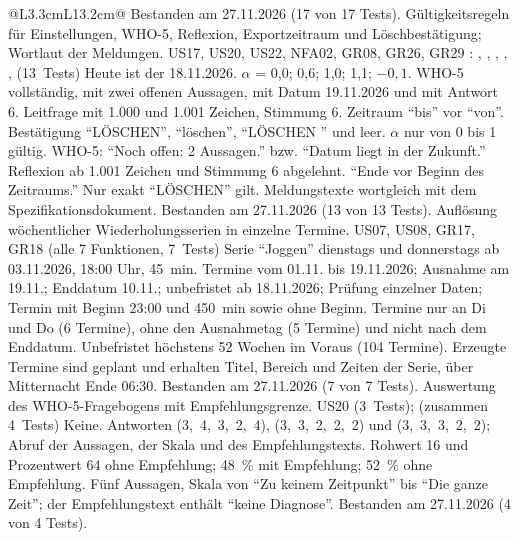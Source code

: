 \begin{longtable}{@{}L{3.3cm}L{13.2cm}@{}}
    {Bestanden am 27.11.2026 (17 von 17 Tests).}
  \midrule
    {Gültigkeitsregeln für Einstellungen, WHO-5, Reflexion, Exportzeitraum und Löschbestätigung; Wortlaut der Meldungen.}
    {US17, US20, US22, NFA02, GR08, GR26, GR29}
    {: , , , , ,  (13~Tests)}
    {Heute ist der 18.11.2026.}
    {$\alpha$ = 0,0; 0,6; 1,0; 1,1; $-0{,}1$. WHO-5 vollständig, mit zwei offenen Aussagen, mit Datum 19.11.2026 und mit Antwort 6. Leitfrage mit 1.000 und 1.001 Zeichen, Stimmung 6. Zeitraum \enquote{bis} vor \enquote{von}. Bestätigung \enquote{LÖSCHEN}, \enquote{löschen}, \enquote{LÖSCHEN } und leer.}
    {$\alpha$ nur von 0 bis 1 gültig. WHO-5: \enquote{Noch offen: 2 Aussagen.} bzw. \enquote{Datum liegt in der Zukunft.} Reflexion ab 1.001 Zeichen und Stimmung 6 abgelehnt. \enquote{Ende vor Beginn des Zeitraums.} Nur exakt \enquote{LÖSCHEN} gilt. Meldungstexte wortgleich mit dem Spezifikationsdokument.}
    {Bestanden am 27.11.2026 (13 von 13 Tests).}
  \midrule
    {Auflösung wöchentlicher Wiederholungsserien in einzelne Termine.}
    {US07, US08, GR17, GR18}
    { (alle 7 Funktionen, 7~Tests)}
    {Serie \enquote{Joggen} dienstags und donnerstags ab 03.11.2026, 18:00 Uhr, 45~min.}
    {Termine vom 01.11. bis 19.11.2026; Ausnahme am 19.11.; Enddatum 10.11.; unbefristet ab 18.11.2026; Prüfung einzelner Daten; Termin mit Beginn 23:00 und 450~min sowie ohne Beginn.}
    {Termine nur an Di und Do (6 Termine), ohne den Ausnahmetag (5 Termine) und nicht nach dem Enddatum. Unbefristet höchstens 52 Wochen im Voraus (104 Termine). Erzeugte Termine sind geplant und erhalten Titel, Bereich und Zeiten der Serie, über Mitternacht Ende 06:30.}
    {Bestanden am 27.11.2026 (7 von 7 Tests).}
  \midrule
    {Auswertung des WHO-5-Fragebogens mit Empfehlungsgrenze.}
    {US20}
    { (3~Tests);  (zusammen 4~Tests)}
    {Keine.}
    {Antworten (3,~4,~3,~2,~4), (3,~3,~2,~2,~2) und (3,~3,~3,~2,~2); Abruf der Aussagen, der Skala und des Empfehlungstexts.}
    {Rohwert 16 und Prozentwert 64 ohne Empfehlung; 48~\% mit Empfehlung; 52~\% ohne Empfehlung. Fünf Aussagen, Skala von \enquote{Zu keinem Zeitpunkt} bis \enquote{Die ganze Zeit}; der Empfehlungstext enthält \enquote{keine Diagnose}.}
    {Bestanden am 27.11.2026 (4 von 4 Tests).}

\end{longtable}
